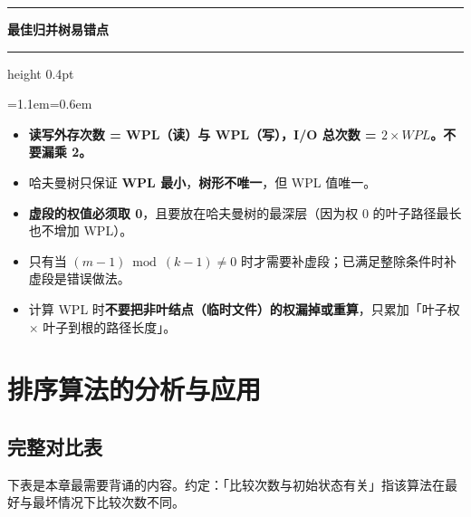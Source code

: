 \documentclass[11pt,openany,UTF8]{ctexbook}
\newcommand{\callouthead}[2]{%
  \par\addvspace{7pt}\noindent
  {\color{#1}\rule[-0.15em]{3pt}{1.05em}}\hspace{0.5em}%
  {\bfseries\color{#1}#2}\par\nobreak\vspace{-0.35em}%
  {\color{rulesep}\hrule height 0.4pt}\nobreak\vspace{0.45em}%
  \begingroup\small\setlength{\parindent}{0pt}%
  \leftskip=1.1em\rightskip=0.6em\noindent\ignorespaces}
\newcommand{\calloutend}{\par\endgroup\addvspace{7pt}}
\newenvironment{callwarn}[1]{\callouthead{warnbar}{#1}}{\calloutend}
\begin{document}
\begin{callwarn}{最佳归并树易错点}
\begin{itemize}
\item \textbf{读写外存次数 = WPL（读）与 WPL（写），I/O 总次数 = $2\times WPL$。不要漏乘 2。}
\item 哈夫曼树只保证 \textbf{WPL 最小}，\textbf{树形不唯一}，但 WPL 值唯一。
\item \textbf{虚段的权值必须取 0}，且要放在哈夫曼树的最深层（因为权 0 的叶子路径最长也不增加 WPL）。
\item 只有当 $(m-1)\bmod(k-1)\ne 0$ 时才需要补虚段；已满足整除条件时补虚段是错误做法。
\item 计算 WPL 时\textbf{不要把非叶结点（临时文件）的权漏掉或重算}，只累加「叶子权 $\times$ 叶子到根的路径长度」。
\end{itemize}
\end{callwarn}

\section{排序算法的分析与应用}

\subsection{完整对比表}

下表是本章最需要背诵的内容。约定：「比较次数与初始状态有关」指该算法在最好与最坏情况下比较次数不同。
\end{document}
